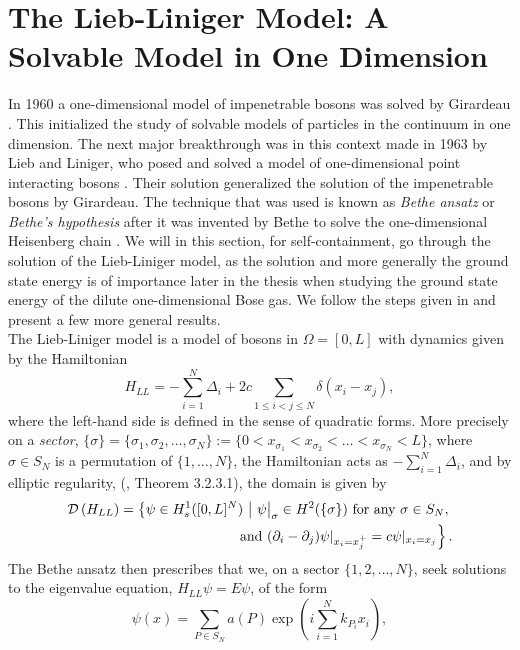 \section{The Lieb-Liniger Model: A Solvable Model in One Dimension} \label{SectionLiebLinigerModel}
In 1960 a one-dimensional model of impenetrable bosons was solved by Girardeau \cite{girardeau1960relationship}. This initialized the study of solvable models of particles in the continuum in one dimension. The next major breakthrough was in this context made in 1963 by Lieb and Liniger, who posed and solved a model of one-dimensional point interacting bosons \cite{lieb1963exact}. Their solution generalized the solution of the impenetrable bosons by Girardeau. The technique that was used is known as \emph{Bethe ansatz} or \emph{Bethe's hypothesis} after it was invented by Bethe to solve the one-dimensional Heisenberg chain \cite{bethe1931theorie}. We will in this section, for self-containment, go through the solution of the Lieb-Liniger model, as the solution and more generally the ground state energy is of importance later in the thesis when studying the ground state energy of the dilute one-dimensional Bose gas. We follow the steps given in \cite{lieb1963exact} and present a few more general results.\\
The Lieb-Liniger model is a model of bosons in $\Omega=[0,L]$ with dynamics given by the Hamiltonian \begin{equation}
H_{LL}=-\sum_{i=1}^{N}\Delta_i+2c \sum_{1\leq i<j\leq N}\delta(x_i-x_j),
\end{equation}
where the left-hand side is defined in the sense of quadratic forms. More precisely on a \emph{sector}, $\{\sigma\}=\{\sigma_1,\sigma_2,\ldots,\sigma_N\}:=\{0< x_{\sigma_1}< x_{\sigma_2} < \ldots < x_{\sigma_N}< L\} $, where $ \sigma\in S_N $ is a permutation of $ \{1,\ldots,N\} $, the Hamiltonian acts as $ -\sum_{i=1}^{N}\Delta_i $, and by elliptic regularity, (\cite{grisvard2011elliptic}, Theorem 3.2.3.1), the domain is given by \begin{equation*}
	\begin{aligned}
	\dom{H_{LL}}=\left\{\psi\in H_s^1([0,L]^N)\ \middle\vert\ \psi\big\rvert_{\sigma}\in H^2(\{\sigma\})\text{ for any }\sigma\in S_{N},\right.\\ \left. \text{ and } (\partial_i-\partial_j)\psi\rvert_{x_i=x_j^+}=c\psi\rvert_{x_i=x_j}\right\}.
	\end{aligned}
\end{equation*}
The Bethe ansatz then prescribes that we, on a sector $ \{1,2,\ldots,N\} $, seek solutions to the eigenvalue equation, $ H_{LL}\psi=E\psi $, of the form\begin{equation}\label{EqBetheAnsatz}
\psi(x)=\sum_{P\in S_N} a(P)\exp\left(i\sum_{i=1}^{N}k_{P_i}x_i\right),
\end{equation}
